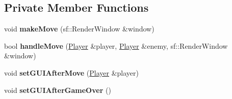\subsection*{Private Member Functions}
\begin{DoxyCompactItemize}
\item 
void {\bfseries make\+Move} (sf\+::\+Render\+Window \&window)\hypertarget{classMultiplayer__State_a21ecdd3177fd35cba51603d1d17d53c1}{}\label{classMultiplayer__State_a21ecdd3177fd35cba51603d1d17d53c1}

\item 
bool {\bfseries handle\+Move} (\hyperlink{classPlayer}{Player} \&player, \hyperlink{classPlayer}{Player} \&enemy, sf\+::\+Render\+Window \&window)\hypertarget{classMultiplayer__State_a6797a4f7a4c3ab4fa18b357156073274}{}\label{classMultiplayer__State_a6797a4f7a4c3ab4fa18b357156073274}

\item 
void {\bfseries set\+G\+U\+I\+After\+Move} (\hyperlink{classPlayer}{Player} \&player)\hypertarget{classMultiplayer__State_afeede160f90a08044468b107432d388d}{}\label{classMultiplayer__State_afeede160f90a08044468b107432d388d}

\item 
void {\bfseries set\+G\+U\+I\+After\+Game\+Over} ()\hypertarget{classMultiplayer__State_ac2cbc737ae1ae37ef04f47bf52333633}{}\label{classMultiplayer__State_ac2cbc737ae1ae37ef04f47bf52333633}

\end{DoxyCompactItemize}
